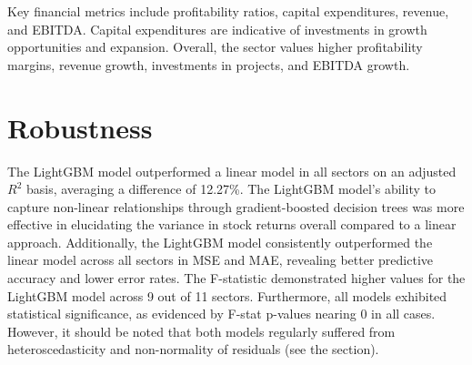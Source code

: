 \documentclass[12pt,a4paper,english]{article}
\begin{document}
Key financial metrics include profitability ratios, capital expenditures, revenue, and EBITDA. Capital expenditures are indicative of investments in growth opportunities and expansion. Overall, the sector values higher profitability margins, revenue growth, investments in projects, and EBITDA growth.

\section{Robustness}
\label{sec:robust}

\newcommand{\tabmstats}[5]{
	\begin{table}[H]
		\centering
		\begin{minipage}{\textwidth}
			\centering
			\caption{#1: Model Statistics}
			\label{tab:#1-model-stats}
			\begin{subtable}{0.695\linewidth}
				\centering
				\caption{Linear: Cross-Validated}
				#2
			\end{subtable}
			\hfill
			\begin{subtable}{0.255\linewidth}
				\centering
				\caption{Linear: Full Dataset}
				#3
			\end{subtable}
			\\[2ex]
			\centering
			\begin{subtable}{0.695\linewidth}
				\centering
				\caption{LGBM: Cross-Validated}
				#4
			\end{subtable}
			\hfill
			\begin{subtable}{0.255\linewidth}
				\centering
				\caption{LGBM: Full Dataset}
				#5
			\end{subtable}
			\footnotetext{Refer to Appendix \ref{appendix:#1} for additional model figures and tables. \vspace{-\baselineskip}}
		\end{minipage}
	\end{table}
}

The LightGBM model outperformed a linear model in all sectors on an adjusted $R^2$ basis, averaging a difference of 12.27\%. The LightGBM model's ability to capture non-linear relationships through gradient-boosted decision trees was more effective in elucidating the variance in stock returns overall compared to a linear approach. Additionally, the LightGBM model consistently outperformed the linear model across all sectors in MSE and MAE, revealing better predictive accuracy and lower error rates. The F-statistic demonstrated higher values for the LightGBM model across 9 out of 11 sectors. Furthermore, all models exhibited statistical significance, as evidenced by F-stat p-values nearing 0 in all cases. However, it should be noted that both models regularly suffered from heteroscedasticity and non-normality of residuals (see the  section).
\end{document}
